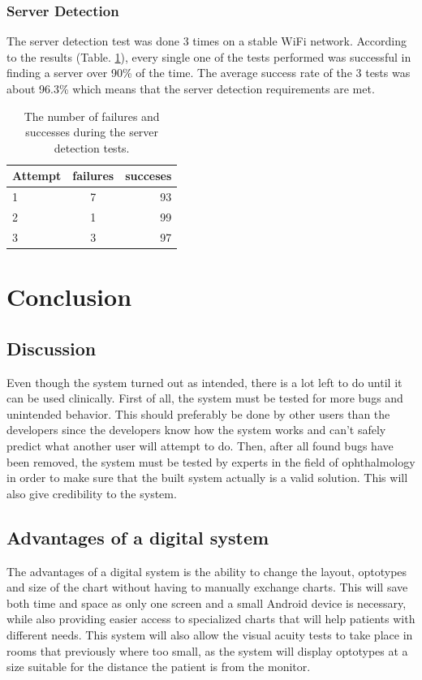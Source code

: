 \documentclass[12pt,a4paper,notitlepage]{report}
\begin{document}
\subsection{Server Detection}
The server detection test was done 3 times on a stable WiFi network. According to the results (Table. \ref{tab:server_detection_test}), every single one of the tests performed was successful in finding a server over 90\% of the time. The average success rate of the 3 tests was about 96.3\% which means that the server detection requirements are met.

\begin{table}[ht!]
\centering
\begin{tabular}{l c r}
Attempt	&	failures	&	succeses	\\
\hline
1	&	7	&	93	\\
2	&	1	&	99	\\
3	&	3	&	97	\\
\end{tabular}
\caption{The number of failures and successes during the server detection tests. \label{tab:server_detection_test}}
\end{table}


\chapter{Conclusion}

\section{Discussion}
Even though the system turned out as intended, there is a lot left to do until it can be used clinically. First of all, the system must be tested for more bugs and unintended behavior. This should preferably be done by other users than the developers since the developers know how the system works and can't safely predict what another user will attempt to do. Then, after all found bugs have been removed, the system must be tested by experts in the field of ophthalmology in order to make sure that the built system actually is a valid solution. This will also give credibility to the system.

\section{Advantages of a digital system}
The advantages of a digital system is the ability to change the layout, optotypes and size of the chart without having to manually exchange charts. This will save both time and space as only one screen and a small Android device is necessary, while also providing easier access to specialized charts that will help patients with different needs. This system will also allow the visual acuity tests to take place in rooms that previously where too small, as the system will display optotypes at a size suitable for the distance the patient is from the monitor.
\end{document}

